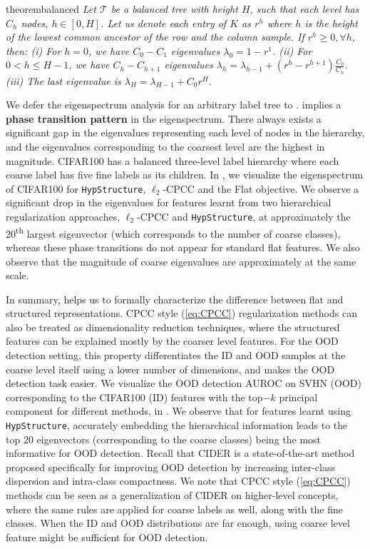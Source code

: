 \begin{restatable}{theorem}{balanced}
    \label{thm:eigen} 
      \textit{Let $\mathcal{T}$ be a balanced tree with height $H$, such that each level has $C_h$ nodes, $h \in [0,H]$. Let us denote each entry of $K$ as $r^h$ where $h$ is the height of the lowest common ancestor of the row and the column sample. If $r^h \geq 0, \forall h$, then:  (i) For $h = 0$, we have $C_0 - C_1$ eigenvalues $\lambda_0 = 1 - r^1$. (ii) For $0 < h \leq H-1$, we have $C_{h} - C_{h+1}$ eigenvalues $\lambda_h = \lambda_{h-1} + (r^{h} - r^{h+1})\frac{C_0}{C_h}$. (iii) The last eigenvalue is $\lambda_{H} = \lambda_{H-1} + C_0 r^H$.}
\end{restatable}

We defer the eigenspectrum analysis for an arbitrary label tree to .  implies a \textbf{phase transition pattern} in the eigenspectrum. There always exists a significant gap in the eigenvalues representing each level of nodes in the hierarchy, and the eigenvalues corresponding to the coarsest level are the highest in magnitude. CIFAR100 has a balanced three-level label hierarchy where each coarse label has five fine labels as its children. In , we visualize the eigenspectrum of CIFAR100 for \texttt{HypStructure}, $\ell_2$-CPCC and the Flat objective. We observe a significant drop in the eigenvalues for features learnt from two hierarchical regularization approaches, $\ell_2$-CPCC and \texttt{HypStructure}, at approximately the 20\textsuperscript{th} largest eigenvector (which corresponds to the number of coarse classes), whereas these phase transitions do not appear for standard flat features. We also observe that the magnitude of coarse eigenvalues are approximately at the same scale. 

In summary,  helps us to formally characterize the difference between flat and structured representations. CPCC style (\cref{eq:CPCC}) regularization methods can also be treated as dimensionality reduction techniques, where the structured features can be explained mostly by the coarser level features. For the OOD detection setting, this property differentiates the ID and OOD samples at the coarse level itself using a lower number of dimensions, and makes the OOD detection task easier. We visualize the OOD detection AUROC on SVHN (OOD) corresponding to the CIFAR100 (ID) features with the top$-k$ principal component for different methods, in . We observe that for features learnt using \texttt{HypStructure}, accurately embedding the hierarchical information leads to the top $20$ eigenvectors (corresponding to the coarse classes) being the most informative for OOD detection. Recall that CIDER \citep{cider2022ming} is a state-of-the-art method proposed specifically for improving OOD detection by increasing inter-class dispersion and intra-class compactness. We note that CPCC style (\cref{eq:CPCC}) methods can be seen as a generalization of CIDER on higher-level concepts, where the same rules are applied for coarse labels as well, along with the fine classes. When the ID and OOD distributions are far enough, using coarse level feature might be sufficient for OOD detection.